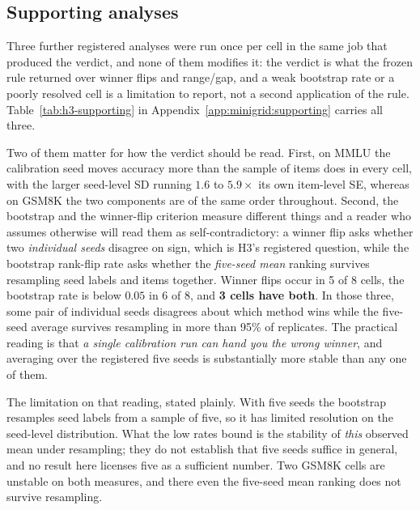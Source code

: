 \subsection{Supporting analyses}
\label{sec:minigrid:supporting}

Three further registered analyses were run once per cell in the same job that
produced the verdict, and none of them modifies it: the verdict is what the
frozen rule returned over winner flips and range/gap, and a weak bootstrap rate
or a poorly resolved cell is a limitation to report, not a second application of
the rule. Table~\ref{tab:h3-supporting} in
Appendix~\ref{app:minigrid:supporting} carries all three.

Two of them matter for how the verdict should be read. First, on MMLU the
calibration seed moves accuracy more than the sample of items does in every
cell, with the larger seed-level SD running $1.6$ to $5.9\times$ its own
item-level SE, whereas on GSM8K the two components are of the same order
throughout. Second, the bootstrap and the winner-flip criterion measure
different things and a reader who assumes otherwise will read them as
self-contradictory: a winner flip asks whether two \emph{individual seeds}
disagree on sign, which is H3's registered question, while the bootstrap
rank-flip rate asks whether the \emph{five-seed mean} ranking survives
resampling seed labels and items together. Winner flips occur in 5 of 8 cells,
the bootstrap rate is below $0.05$ in 6 of 8, and \textbf{3 cells have both}. In
those three, some pair of individual seeds disagrees about which method wins
while the five-seed average survives resampling in more than 95\% of
replicates. The practical reading is that \emph{a single calibration run can
hand you the wrong winner}, and averaging over the registered five seeds is
substantially more stable than any one of them.

The limitation on that reading, stated plainly. With five seeds the bootstrap
resamples seed labels from a sample of five, so it has limited resolution on the
seed-level distribution. What the low rates bound is the stability of
\emph{this} observed mean under resampling; they do not establish that five
seeds suffice in general, and no result here licenses five as a sufficient
number. Two GSM8K cells are unstable on both measures, and there even the
five-seed mean ranking does not survive resampling.

